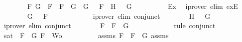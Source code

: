 \begin{isabellebody}
\ \ \ \ \ \ \isamarkupfalse%
\ F{}\ G{}\ \ {}{\isacharcolon}{\isachardoublequoteopen}F\ {\isacharequal}\ \isactrlbold {\isasymnot}{\isacharparenleft}F{}\ \isactrlbold {\isasymor}\ G{}{\isacharparenright}\ {\isasymand}\ G\ {\isacharequal}\ \isactrlbold {\isasymnot}\ F{}\ {\isasymand}\ H\ {\isacharequal}\ \isactrlbold {\isasymnot}\ G{}{\isachardoublequoteclose}\isanewline
\ \ \ \ \ \ \ \ \isamarkupfalse%
\ Ex{}\ \isamarkupfalse%
\ {\isacharparenleft}iprover\ elim{\isacharcolon}\ exE{\isacharparenright}\isanewline
\ \ \ \ \ \ \isamarkupfalse%
\ {\isachardoublequoteopen}G\ {\isacharequal}\ \isactrlbold {\isasymnot}\ F{}{\isachardoublequoteclose}\isanewline
\ \ \ \ \ \ \ \ \isamarkupfalse%
\ {}\ \isamarkupfalse%
\ {\isacharparenleft}iprover\ elim{\isacharcolon}\ conjunct{}{\isacharparenright}\isanewline
\ \ \ \ \ \ \isamarkupfalse%
\ {\isachardoublequoteopen}H\ {\isacharequal}\ \isactrlbold {\isasymnot}\ G{}{\isachardoublequoteclose}\isanewline
\ \ \ \ \ \ \ \ \isamarkupfalse%
\ {}\ \isamarkupfalse%
\ {\isacharparenleft}iprover\ elim{\isacharcolon}\ conjunct{}{\isacharparenright}\isanewline
\ \ \ \ \ \ \isamarkupfalse%
\ {\isachardoublequoteopen}F\ {\isacharequal}\ \isactrlbold {\isasymnot}{\isacharparenleft}F{}\ \isactrlbold {\isasymor}\ G{}{\isacharparenright}{\isachardoublequoteclose}\isanewline
\ \ \ \ \ \ \ \ \isamarkupfalse%
\ {}\ \isamarkupfalse%
\ {\isacharparenleft}rule\ conjunct{}{\isacharparenright}\isanewline
\ \ \ \ \ \ \isamarkupfalse%
\ {\isachardoublequoteopen}sat\ {\isacharparenleft}{\isacharbraceleft}\isactrlbold {\isasymnot}\ F{}{\isacharcomma}\ \isactrlbold {\isasymnot}\ G{}{\isacharcomma}\ F{\isacharbraceright}\ {\isasymunion}\ Wo{\isacharparenright}{\isachardoublequoteclose}\isanewline
\ \ \ \ \ \ \ \ \isamarkupfalse%
\ assms{\isacharparenleft}{}{\isacharparenright}\ {\isacartoucheopen}F\ {\isacharequal}\ \isactrlbold {\isasymnot}{\isacharparenleft}F{}\ \isactrlbold {\isasymor}\ G{}{\isacharparenright}{\isacartoucheclose}\ assms{\isacharparenleft}{}{\isacharcomma}{}{\isacharcomma}{}{\isacharparenright}\ \isamarkupfalse%

\end{isabellebody}

